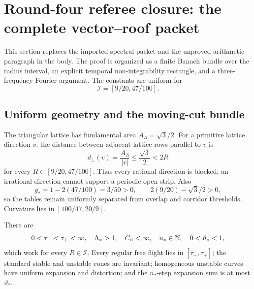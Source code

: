 \section{Round-four referee closure: the complete vector--roof packet}
\label{sec:r3-a2}

This section replaces the imported spectral packet and the unproved arithmetic
paragraph in the body.  The proof is organized as a finite Banach bundle over
the radius interval, an explicit temporal non-integrability rectangle, and a
three-frequency Fourier argument.  The constants are uniform for
\[
 \mathcal I=[9/20,47/100].
\]

\subsection{Uniform geometry and the moving-cut bundle}

The triangular lattice has fundamental area \(A_\Lambda=\sqrt3/2\).  For a primitive lattice direction \(v\), the distance between adjacent lattice rows
parallel to \(v\) is
\[
 d_\perp(v)=\frac{A_\Lambda}{|v|}
 \le\frac{\sqrt3}{2}<2R
\]
for every \(R\in[9/20,47/100]\).  Thus every rational direction is blocked;
an irrational direction cannot support a periodic open strip.  Also
\[
 g_*=1-2(47/100)=3/50>0,
 \qquad
 2(9/20)-\sqrt3/2>0,
\]
so the tables remain uniformly separated from overlap and corridor
thresholds.  Curvature lies in \([100/47,20/9]\).

\begin{lemma}
\label{lem:r3-a2-geometry}
There are
\[
 0<\tau_-<\tau_+<\infty,
 \quad \Lambda_*>1,
 \quad C_{\rm d}<\infty,
 \quad n_*\in\mathbb N,
 \quad 0<\vartheta_*<1,
\]
which work for every \(R\in\mathcal I\).  Every regular free flight lies in
\([\tau_-,\tau_+]\); the standard stable and unstable cones are invariant;
homogeneous unstable curves have uniform expansion and distortion; and the
\(n_*\)-step expansion sum is at most \(\vartheta_*\).
\end{lemma}

